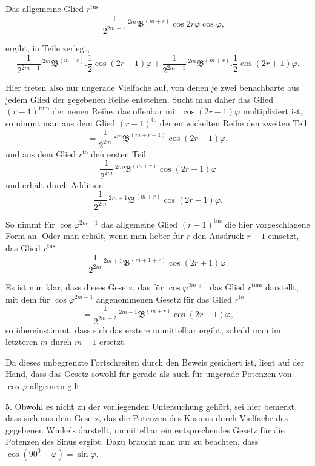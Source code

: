 \par\noindent{}%
\hspace*{\parindent}Das allgemeine Glied $r^{\text{tus}}$
\[
= \frac{1}{2^{2m-1}}\,{}^{2m}\mathfrak{B}^{(m+r)}\cos 2r\varphi\cos\varphi,
\]
\par\noindent ergibt, in Teile zerlegt,
\[
\frac{1}{2^{2m-1}}\,{}^{2m}\mathfrak{B}^{(m+r)} . \frac{1}{2}\cos(2r-1)\varphi
+ \frac{1}{2^{2m-1}}\,{}^{2m}\mathfrak{B}^{(m+r)} . \frac{1}{2}\cos(2r+1)\varphi.
\]

\par\noindent Hier treten also nur ungerade Vielfache auf, von denen je zwei benachbarte aus jedem Glied der gegebenen Reihe entstehen. Sucht man daher das Glied $(r-1)^{\text{tum}}$ der neuen Reihe, das offenbar mit $\cos(2r-1)\varphi$ multipliziert ist, so nimmt man aus dem Glied $(r-1)^{\text{to}}$ der entwickelten Reihe den zweiten Teil
\[
= \frac{1}{2^{2m}}\,{}^{2m}\mathfrak{B}^{(m+r-1)}\cos(2r-1)\varphi,
\]
und aus dem Glied $r^{\text{to}}$ den ersten Teil
\[
\frac{1}{2^{2m}}\,{}^{2m}\mathfrak{B}^{(m+r)}\cos(2r-1)\varphi
\]
und erhält durch Addition
\[
\frac{1}{2^{2m}}\,{}^{2m+1}\mathfrak{B}^{(m+r)}\cos(2r-1)\varphi.
\]

\par\noindent So nimmt für $\cos\varphi^{2m+1}$ das allgemeine Glied $(r-1)^{\text{tus}}$ die hier vorgeschlagene Form an. Oder man erhält, wenn man lieber für $r$ den Ausdruck $r+1$ einsetzt, das Glied
$r^{\text{tus}}$
\[
\frac{1}{2^{2m}}\,{}^{2m+1}\mathfrak{B}^{(m+1+r)}\cos(2r+1)\varphi.
\]

\par\noindent Es ist nun klar, dass dieses Gesetz, das für $\cos\varphi^{2m+1}$ das Glied $r^{\text{tum}}$ darstellt, mit dem für $\cos\varphi^{2m-1}$ angenommenen Gesetz für das Glied $r^{\text{to}}$
\[
= \frac{1}{2^{2m-2}}\,{}^{2m-1}\mathfrak{B}^{(m+r)}\cos(2r+1)\varphi,
\]
so übereinstimmt, dass sich das erstere unmittelbar ergibt, sobald man im letzteren $m$ durch $m+1$ ersetzt.

\par\noindent\hspace*{\parindent}Da dieses unbegrenzte Fortschreiten durch den Beweis gesichert ist, liegt auf der Hand, dass das Gesetz sowohl für gerade als auch für ungerade Potenzen von $\cos\varphi$ allgemein gilt.

5. Obwohl es nicht zu der vorliegenden Untersuchung gehört, sei hier bemerkt, dass sich aus dem Gesetz, das die Potenzen des Kosinus durch Vielfache des gegebenen Winkels darstellt, unmittelbar ein entsprechendes Gesetz für die Potenzen des Sinus ergibt. Dazu braucht man nur zu beachten, dass
$\cos(90^0-\varphi) = \sin\varphi$.
